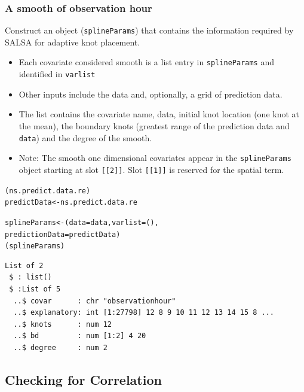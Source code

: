 \begin{frame}[fragile]
\frametitle{A smooth of observation hour}

Construct an object ({\tt splineParams}) that contains the information required by SALSA for adaptive knot placement.
\begin{itemize}
\item Each covariate considered smooth is a list entry in {\tt splineParams} and identified in {\tt varlist}
\item Other inputs include the data and, optionally, a grid of prediction data.
\item The list contains the covariate name, data, initial knot location (one knot at the mean), the boundary knots (greatest range of the prediction data and {\tt data}) and the degree of the smooth.
\item Note:  The smooth one dimensional covariates appear in the {\tt splineParams} object starting at slot {\tt [[2]]}. Slot {\tt [[1]]} is reserved for the spatial term.
\end{itemize}

\begin{knitrout}\footnotesize
{}\color{fgcolor}\begin{kframe}
\begin{alltt}
(ns.predict.data.re)
predictData<-ns.predict.data.re

splineParams<-(data=data, varlist=(),
         predictionData=predictData)
(splineParams)
\begin{verbatim}
List of 2
 $ : list()
 $ :List of 5
  ..$ covar      : chr "observationhour"
  ..$ explanatory: int [1:27798] 12 8 9 10 11 12 13 14 15 8 ...
  ..$ knots      : num 12
  ..$ bd         : num [1:2] 4 20
  ..$ degree     : num 2
\end{verbatim}
\end{alltt}
\end{kframe}
\end{knitrout}
\end{frame}


\subsection{Checking for Correlation}

